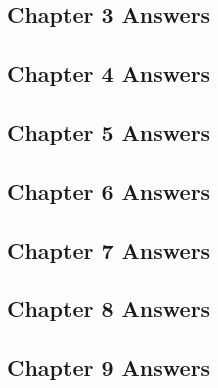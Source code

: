 \documentclass[
  11pt,
  openany]{book}
\begin{document}
\newpage

\newpage

\subsection*{Chapter 3 Answers}\label{chapter-3-answers}

\newpage

\newpage

\subsection*{Chapter 4 Answers}\label{chapter-4-answers}

\newpage

\newpage

\subsection*{Chapter 5 Answers}\label{chapter-5-answers}

\newpage

\newpage

\subsection*{Chapter 6 Answers}\label{chapter-6-answers}

\newpage

\newpage

\subsection*{Chapter 7 Answers}\label{chapter-7-answers}

\newpage

\newpage

\subsection*{Chapter 8 Answers}\label{chapter-8-answers}

\newpage

\newpage

\subsection*{Chapter 9 Answers}\label{chapter-9-answers}
\end{document}
